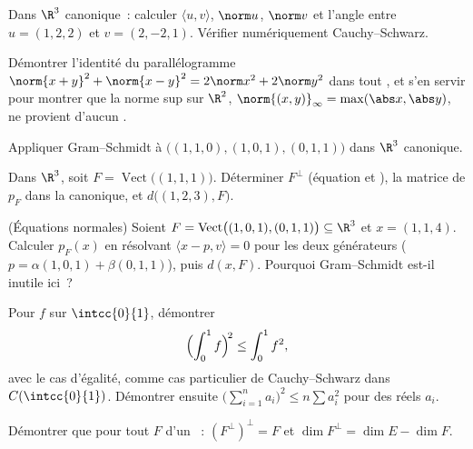 \begin{exercise}[$\star$]\label{exo:b1:euclid:1}
Dans $\R^3$ canonique~: calculer $\langle u, v\rangle$, $\norm u$,
$\norm v$ et l'angle entre $u = (1, 2, 2)$ et $v = (2, -2,
1)$. Vérifier numériquement Cauchy--Schwarz.
\end{exercise}

\begin{exercise}[$\star$]\label{exo:b1:euclid:2}
Démontrer l'identité du parallélogramme $\norm{x+y}^2 +
\norm{x-y}^2 = 2\norm x^2 + 2\norm y^2$ dans tout ,
et s'en servir pour montrer que la norme sup sur $\R^2$,
$\norm{(x,y)}_\infty = \max(\abs x, \abs y)$, ne provient d'aucun
.
\end{exercise}

\begin{exercise}[$\star$]\label{exo:b1:euclid:3}
Appliquer Gram--Schmidt à $\bigl((1,1,0), (1,0,1), (0,1,1)\bigr)$
dans $\R^3$ canonique.
\end{exercise}

\begin{exercise}[$\star$]\label{exo:b1:euclid:4}
Dans $\R^3$, soit $F = \operatorname{Vect}\bigl((1,1,1)\bigr)$.
Déterminer $F^\perp$ (équation et ), la matrice de $p_F$ dans
la  canonique, et $d\bigl((1, 2, 3), F\bigr)$.
\end{exercise}

\begin{exercise}[$\star\star$]\label{exo:b1:euclid:5}
(Équations normales) Soient $F =
\operatorname{Vect}\bigl((1,0,1),(0,1,1)\bigr) \subseteq \R^3$ et
$x = (1, 1, 4)$. Calculer $p_F(x)$ en résolvant $\langle x - p, v
\rangle = 0$ pour les deux générateurs ($p = \alpha(1,0,1) +
\beta(0,1,1)$), puis $d(x, F)$. Pourquoi Gram--Schmidt est-il
inutile ici~?
\end{exercise}

\begin{exercise}[$\star\star$]\label{exo:b1:euclid:6}
Pour $f$  sur $\intcc{0}{1}$, démontrer
\[
\Bigl(\int_0^1 f\Bigr)^{\!2} \leq \int_0^1 f^2 ,
\]
avec le cas d'égalité, comme cas particulier de Cauchy--Schwarz
dans $C(\intcc{0}{1})$. Démontrer ensuite $\bigl(\sum_{i=1}^n
a_i\bigr)^2 \leq n \sum a_i^2$ pour des réels $a_i$.
\end{exercise}

\begin{exercise}[$\star\star$]\label{exo:b1:euclid:7}
Démontrer que pour tout  $F$ d'un ~:
$(F^{\perp})^{\perp} = F$ et $\dim F^{\perp} = \dim E - \dim F$.
\end{exercise}

